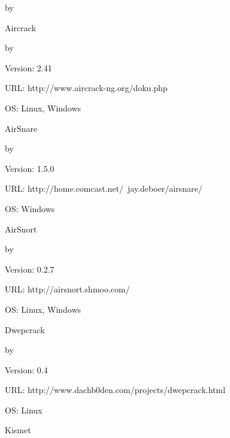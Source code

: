 \begin{appendix}
\begin{list}{}
	{
		\setlength{\labelwidth}{10em}
		\leftmargin{} \advance\leftmargin by 
		\renewcommand{\makelabel}[1]{\mbox{\textbf{#1}}\dotfill}
	}
	\item[Aircrack] \begin{list}{}
		{
			\setlength{\parsep}{0em}
			\setlength{\labelwidth}{4em}
			\leftmargin{} \advance\leftmargin by 
			\renewcommand{\makelabel}[1]{\mbox{#1}}
		}
		\item[Version:] 2.41
		\item[URL:] http://www.aircrack-ng.org/doku.php
		\item[OS:] Linux, Windows
	\end{list}
	\item[AirSnare] \begin{list}{}
		{
			\setlength{\parsep}{0em}
			\setlength{\labelwidth}{4em}
			\leftmargin{} \advance\leftmargin by 
			\renewcommand{\makelabel}[1]{\mbox{#1}}
		}
		\item[Version:] 1.5.0
		\item[URL:] http://home.comcast.net/~jay.deboer/airsnare/
		\item[OS:] Windows
	\end{list}
	\item[AirSnort] \begin{list}{}
		{
			\setlength{\parsep}{0em}
			\setlength{\labelwidth}{4em}
			\leftmargin{} \advance\leftmargin by 
			\renewcommand{\makelabel}[1]{\mbox{#1}}
		}
		\item[Version:] 0.2.7
		\item[URL:] http://airsnort.shmoo.com/
		\item[OS:] Linux, Windows
	\end{list}
	\item[Dwepcrack] \begin{list}{}
		{
			\setlength{\parsep}{0em}
			\setlength{\labelwidth}{4em}
			\leftmargin{} \advance\leftmargin by 
			\renewcommand{\makelabel}[1]{\mbox{#1}}
		}
		\item[Version:] 0.4
		\item[URL:] http://www.dachb0den.com/projects/dwepcrack.html
		\item[OS:] Linux
	\end{list}
	\item[Kismet] \begin{list}{}
		{
			\setlength{\parsep}{0em}
			\setlength{\labelwidth}{4em}
}
\end{list}
\end{list}
\end{appendix}
